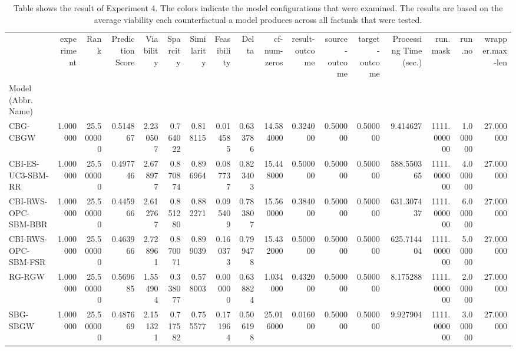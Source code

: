\begin{table}
\caption{Table shows the result of Experiment 4. The colors indicate the model configurations that were examined. The results are based on the average viability each counterfactual a model produces across all factuals that were tested.}
\label{tbl:exp4-winner}
\begin{tabular}{lrrrrrrrrrrrrrrrr}
 & experiment & Rank & Prediction Score & Viability & Sparcity & Similarity & Feasibility & Delta & cf-num-zeros & result-outcome & source-outcome & target-outcome & Processing Time (sec.) & run.mask & run.no & wrapper.max-len \\
Model (Abbr. Name) &  &  &  &  &  &  &  &  &  &  &  &  &  &  &  &  \\
CBG-CBGW & 1.000000 & 25.500000 & 0.514867 & 2.230507 & 0.764022 & 0.818115 & 0.014585 & 0.633786 & 14.584000 & 0.324000 & 0.500000 & 0.500000 & 9.414627 & 1111.000000 & 1.000000 & 27.000000 \\
CBI-ES-UC3-SBM-RR & 1.000000 & 25.500000 & 0.497746 & 2.678977 & 0.870874 & 0.896964 & 0.087737 & 0.823403 & 15.448000 & 0.500000 & 0.500000 & 0.500000 & 588.550365 & 1111.000000 & 4.000000 & 27.000000 \\
CBI-RWS-OPC-SBM-BBR & 1.000000 & 25.500000 & 0.445966 & 2.612767 & 0.851280 & 0.882271 & 0.095409 & 0.783807 & 15.560000 & 0.384000 & 0.500000 & 0.500000 & 631.307437 & 1111.000000 & 6.000000 & 27.000000 \\
CBI-RWS-OPC-SBM-FSR & 1.000000 & 25.500000 & 0.463966 & 2.728961 & 0.870071 & 0.899039 & 0.160373 & 0.799478 & 15.432000 & 0.500000 & 0.500000 & 0.500000 & 625.714404 & 1111.000000 & 5.000000 & 27.000000 \\
RG-RGW & 1.000000 & 25.500000 & 0.569685 & 1.554904 & 0.338077 & 0.578003 & 0.000000 & 0.638824 & 1.034000 & 0.432000 & 0.500000 & 0.500000 & 8.175288 & 1111.000000 & 2.000000 & 27.000000 \\
SBG-SBGW & 1.000000 & 25.500000 & 0.487669 & 2.151321 & 0.717582 & 0.755577 & 0.171964 & 0.506198 & 25.016000 & 0.016000 & 0.500000 & 0.500000 & 9.927904 & 1111.000000 & 3.000000 & 27.000000 \\
\end{tabular}
\end{table}
